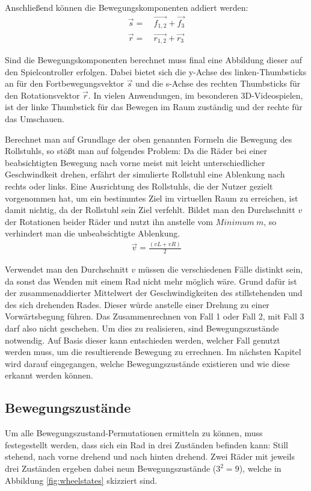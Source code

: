 Anschließend können die Bewegungskomponenten addiert werden:
\begin{align}
    \vec{s} = & \ \vec{f_{1,2}} + \vec{f_3} \\
    \vec{r} = & \ \vec{r_{1,2}} + \vec{r_3}
\end{align}

Sind die Bewegungskomponenten berechnet muss final eine Abbildung dieser auf den Spielcontroller erfolgen.
Dabei bietet sich die y-Achse des linken-Thumbsticks an für den Fortbewegungsvektor $\vec{s}$ und die s-Achse des rechten Thumbsticks für den Rotationsvektor $\vec{r}$.
In vielen Anwendungen, im besonderen 3D-Videospielen, ist der linke Thumbstick für das Bewegen im Raum zuständig und der rechte für das Umschauen.

Berechnet man auf Grundlage der oben genannten Formeln die Bewegung des Rollstuhls, so stößt man auf folgendes Problem:
Da die Räder bei einer beabsichtigten Bewegung nach vorne meist mit leicht unterschiedlicher Geschwindkeit drehen, erfährt der simulierte Rollstuhl eine Ablenkung nach rechts oder links.
Eine Ausrichtung des Rollstuhls, die der Nutzer gezielt vorgenommen hat, um ein bestimmtes Ziel im virtuellen Raum zu erreichen, ist damit nichtig, da der Rollstuhl sein Ziel verfehlt.
Bildet man den Durchschnitt $v$ der Rotationen beider Räder und nutzt ihn anstelle vom $Minimum\ m$, so verhindert man die unbeabsichtigte Ablenkung.
\begin{align}
    \vec{v} = \frac {(vL + vR)} {2}
\end{align}

Verwendet man den Durchschnitt $v$ müssen die verschiedenen Fälle distinkt sein, da sonst das Wenden mit einem Rad nicht mehr möglich wäre.
Grund dafür ist der zusammenaddierter Mittelwert der Geschwindigkeiten des stillstehenden und des sich drehenden Rades.
Dieser würde anstelle einer Drehung zu einer Vorwärtsbegung führen.
Das Zusammenrechnen von Fall 1 oder Fall 2, mit Fall 3 darf also nicht geschehen.
Um dies zu realisieren, sind Bewegungszustände notwendig.
Auf Basis dieser kann entschieden werden, welcher Fall genutzt werden muss, um die resultierende Bewegung zu errechnen.
Im nächsten Kapitel wird darauf eingegangen, welche Bewegungszustände existieren und wie diese erkannt werden können.

\subsection{Bewegungszustände}
Um alle Bewegungszustand-Permutationen ermitteln zu können, muss festegestellt werden, dass sich ein Rad in drei Zuständen befinden kann: Still stehend, nach vorne drehend und nach hinten drehend.
Zwei Räder mit jeweils drei Zuständen ergeben dabei neun Bewegungszustände ($3^2 = 9$), welche in Abbildung \ref{fig:wheelstates} skizziert sind.

